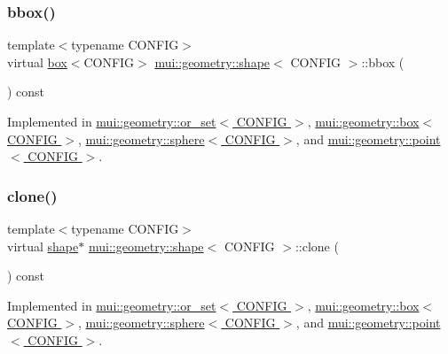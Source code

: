 \subsubsection{\texorpdfstring{bbox()}{bbox()}}
{\footnotesize\ttfamily template$<$typename C\+O\+N\+F\+IG$>$ \\
virtual \hyperlink{classmui_1_1geometry_1_1box}{box}$<$C\+O\+N\+F\+IG$>$ \hyperlink{classmui_1_1geometry_1_1shape}{mui\+::geometry\+::shape}$<$ C\+O\+N\+F\+IG $>$\+::bbox (\begin{DoxyParamCaption}{ }\end{DoxyParamCaption}) const\hspace{0.3cm}{\ttfamily [pure virtual]}}



Implemented in \hyperlink{classmui_1_1geometry_1_1or__set_ac5789620d2af6810d8f7c02d5190429f}{mui\+::geometry\+::or\+\_\+set$<$ C\+O\+N\+F\+I\+G $>$}, \hyperlink{classmui_1_1geometry_1_1box_a900ea59f5e2745d18664690dc52c642b}{mui\+::geometry\+::box$<$ C\+O\+N\+F\+I\+G $>$}, \hyperlink{classmui_1_1geometry_1_1sphere_a08cbc924590d6c82989eac785dab05d4}{mui\+::geometry\+::sphere$<$ C\+O\+N\+F\+I\+G $>$}, and \hyperlink{classmui_1_1geometry_1_1point_ac858e6315e18e6e2a16166e4db748e32}{mui\+::geometry\+::point$<$ C\+O\+N\+F\+I\+G $>$}.

\mbox{\label{classmui_1_1geometry_1_1shape_a4d1307ebc40d462b13da89c811b3beb7}} 
\subsubsection{\texorpdfstring{clone()}{clone()}}
{\footnotesize\ttfamily template$<$typename C\+O\+N\+F\+IG$>$ \\
virtual \hyperlink{classmui_1_1geometry_1_1shape}{shape}$\ast$ \hyperlink{classmui_1_1geometry_1_1shape}{mui\+::geometry\+::shape}$<$ C\+O\+N\+F\+IG $>$\+::clone (\begin{DoxyParamCaption}{ }\end{DoxyParamCaption}) const\hspace{0.3cm}{\ttfamily [pure virtual]}}



Implemented in \hyperlink{classmui_1_1geometry_1_1or__set_a265ef0385d0822f3222e0ef669eb4fc5}{mui\+::geometry\+::or\+\_\+set$<$ C\+O\+N\+F\+I\+G $>$}, \hyperlink{classmui_1_1geometry_1_1box_aa7422049fe305395107f9cfd04c804bf}{mui\+::geometry\+::box$<$ C\+O\+N\+F\+I\+G $>$}, \hyperlink{classmui_1_1geometry_1_1sphere_a7cb7ff26e352d733ce5194d83c4d4065}{mui\+::geometry\+::sphere$<$ C\+O\+N\+F\+I\+G $>$}, and \hyperlink{classmui_1_1geometry_1_1point_ab6e1db8a0e4c6bf07baa31d3e03b0e9c}{mui\+::geometry\+::point$<$ C\+O\+N\+F\+I\+G $>$}.


